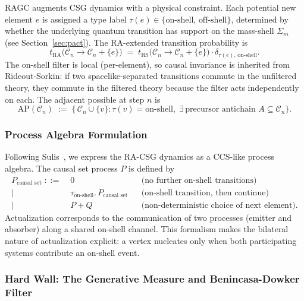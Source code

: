 \documentclass[11pt,a4paper]{article}
\theoremstyle{plain}
\theoremstyle{definition}
\theoremstyle{remark}
\newcommand{\Sigmam}{\Sigma_{m}}
\newcommand{\AP}{\mathrm{AP}}
\begin{document}
RAGC augments CSG dynamics with a physical constraint. Each potential new element
$e$ is assigned a type label $\tau(e) \in \{\text{on-shell},\,\text{off-shell}\}$,
determined by whether the underlying quantum transition has support on the
mass-shell $\Sigmam$ (see Section~\ref{sec:pact}). The RA-extended transition
probability is
\begin{equation}
  t_{\mathrm{RA}}\bigl(\mathcal{C}_{n} \to \mathcal{C}_{n} + \{e\}\bigr)
  \;=\;
  t_{\mathrm{RS}}\bigl(\mathcal{C}_{n} \to \mathcal{C}_{n} + \{e\}\bigr)
  \cdot \delta_{\tau(e),\,\text{on-shell}}.
\end{equation}
The on-shell filter is local (per-element), so causal invariance is inherited from
Rideout-Sorkin: if two spacelike-separated transitions commute in the unfiltered
theory, they commute in the filtered theory because the filter acts independently
on each. The adjacent possible at step $n$ is
\begin{equation}
  \AP(\mathcal{C}_{n})
  \;:=\;
  \bigl\{\, \mathcal{C}_{n} \cup \{v\} :
    \tau(v) = \text{on-shell},\;
    \exists\,\text{precursor antichain } A \subseteq \mathcal{C}_{n}
  \bigr\}.
\end{equation}

\subsubsection{Process Algebra Formulation}

Following Sulis~\citep{Sulis2020}, we express the RA-CSG dynamics as a
CCS-like process algebra. The causal set process $P$ is defined by
\begin{align*}
  P_{\text{causal set}} \;::=\;&
    0 & &\text{(no further on-shell transitions)}\\
    \mid\;& \tau_{\text{on-shell}}.\,P_{\text{causal set}}
            & &\text{(on-shell transition, then continue)}\\
    \mid\;& P + Q
            & &\text{(non-deterministic choice of next element).}
\end{align*}
Actualization corresponds to the communication of two processes (emitter and
absorber) along a shared on-shell channel. This formalism makes the bilateral
nature of actualization explicit: a vertex nucleates only when both participating
systems contribute an on-shell event.

\subsubsection{Hard Wall: The Generative Measure and Benincasa-Dowker Filter}
\end{document}
